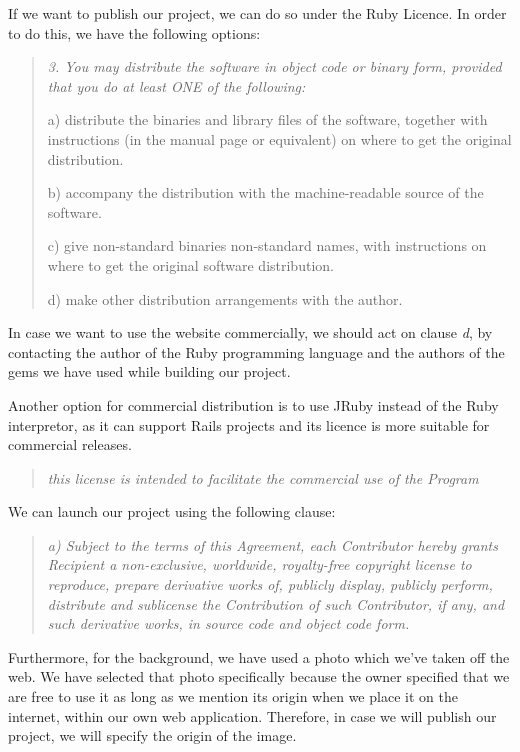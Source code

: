 \documentclass[a4wide, 11pt]{article}
\newenvironment{italicquotes}
{\begin{quote}\itshape\small}
{\end{quote}}
\begin{document}
If we want to publish our project, we can do so under the Ruby Licence.
In order to do this, we have the following options:

\begin{italicquotes}
3. You may distribute the software in object code or binary form,
   provided that you do at least ONE of the following:

a) distribute the binaries and library files of the software,
together with instructions (in the manual page or equivalent)
on where to get the original distribution.

b) accompany the distribution with the machine-readable source of
the software.

c) give non-standard binaries non-standard names, with
instructions on where to get the original software distribution.

d) make other distribution arrangements with the author.
     \cite{Rubylicence}
\end{italicquotes}

In case we want to use the website commercially, we should act on clause 
{\it d}, by contacting the author of the Ruby programming language and the
authors of the gems we have used while building our project.

Another option for commercial distribution is to use JRuby instead of the Ruby
interpretor, as it can support Rails projects and its licence is more suitable
for commercial releases.

\begin{italicquotes}
this license is intended to facilitate the commercial use of the Program
\cite{JRubylicence}
\end{italicquotes}

We can launch our project using the following clause:

\begin{italicquotes}
a) Subject to the terms of this Agreement, each Contributor hereby grants
Recipient a non-exclusive, worldwide, royalty-free copyright license to
reproduce, prepare derivative works of, publicly display, publicly perform,
distribute and sublicense the Contribution of such Contributor, if any, and
such derivative works, in source code and object code form.
\cite{JRubylicence}
\end{italicquotes}

Furthermore, for the background, we have used a photo which we've taken off the
web. We have selected that photo specifically because the owner specified that
we are free to use it as long as we mention its origin when we place it on the
internet, within our own web application. Therefore, in case we will publish
our project, we will specify the origin of the image.
\end{document}
